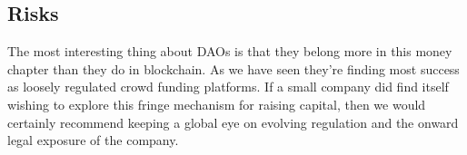 \subsection{Risks}

The most interesting thing about DAOs is that they belong more in this money chapter than they do in blockchain. As we have seen they're finding most success as loosely regulated crowd funding platforms. If a small company did find itself wishing to explore this fringe mechanism for raising capital, then we would certainly recommend keeping a global eye on evolving regulation and the onward legal exposure of the company. 